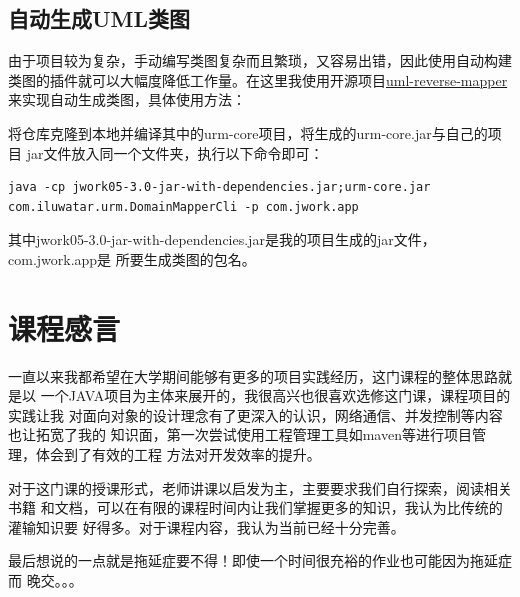 \documentclass{SCIS2022cn}
\begin{document}
\subsection{自动生成UML类图}

由于项目较为复杂，手动编写类图复杂而且繁琐，又容易出错，因此使用自动构建
类图的插件就可以大幅度降低工作量。在这里我使用开源项目\href{https://github.com/iluwatar/uml-reverse-mapper}
{uml-reverse-mapper}来实现自动生成类图，具体使用方法：

将仓库克隆到本地并编译其中的urm-core项目，将生成的urm-core.jar与自己的项目
jar文件放入同一个文件夹，执行以下命令即可：

\lstset{language=bash,numbers=none}
\begin{lstlisting}
java -cp jwork05-3.0-jar-with-dependencies.jar;urm-core.jar com.iluwatar.urm.DomainMapperCli -p com.jwork.app
\end{lstlisting}

其中jwork05-3.0-jar-with-dependencies.jar是我的项目生成的jar文件，com.jwork.app是
所要生成类图的包名。

\section{课程感言}

一直以来我都希望在大学期间能够有更多的项目实践经历，这门课程的整体思路就是以
一个JAVA项目为主体来展开的，我很高兴也很喜欢选修这门课，课程项目的实践让我
对面向对象的设计理念有了更深入的认识，网络通信、并发控制等内容也让拓宽了我的
知识面，第一次尝试使用工程管理工具如maven等进行项目管理，体会到了有效的工程
方法对开发效率的提升。

对于这门课的授课形式，老师讲课以启发为主，主要要求我们自行探索，阅读相关书籍
和文档，可以在有限的课程时间内让我们掌握更多的知识，我认为比传统的灌输知识要
好得多。对于课程内容，我认为当前已经十分完善。

最后想说的一点就是拖延症要不得！即使一个时间很充裕的作业也可能因为拖延症而
晚交。。。
\end{document}
